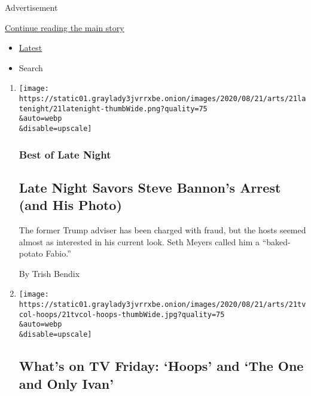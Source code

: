 Advertisement

\protect\hyperlink{after-mid1}{Continue reading the main story}

\begin{itemize}
\tightlist
\item
  \protect\hyperlink{stream-panel}{Latest}
\item
  Search
\end{itemize}

\begin{enumerate}
\def\labelenumi{\arabic{enumi}.}
\item
  \href{/2020/08/21/arts/television/late-night-steve-bannon-seth-meyers.html}{}

  \texttt{[image: https://static01.graylady3jvrrxbe.onion/images/2020/08/21/arts/21latenight/21latenight-thumbWide.png?quality=75\\\&auto=webp\\\&disable=upscale]}

  \hypertarget{best-of-late-night}{%
  \subsubsection{Best of Late Night}\label{best-of-late-night}}

  \hypertarget{late-night-savors-steve-bannons-arrest-and-his-photo}{%
  \subsection{Late Night Savors Steve Bannon's Arrest (and His
  Photo)}\label{late-night-savors-steve-bannons-arrest-and-his-photo}}

  The former Trump adviser has been charged with fraud, but the hosts
  seemed almost as interested in his current look. Seth Meyers called
  him a ``baked-potato Fabio.''

  By Trish Bendix
\item
  \href{/2020/08/21/arts/television/whats-on-tv-friday-hoops-and-the-one-and-only-ivan.html}{}

  \texttt{[image: https://static01.graylady3jvrrxbe.onion/images/2020/08/21/arts/21tvcol-hoops/21tvcol-hoops-thumbWide.jpg?quality=75\\\&auto=webp\\\&disable=upscale]}

  \hypertarget{whats-on-tv-friday-hoops-and-the-one-and-only-ivan}{%
  \subsection{What's on TV Friday: `Hoops' and `The One and Only
  Ivan'}\label{whats-on-tv-friday-hoops-and-the-one-and-only-ivan}}


\end{enumerate}

